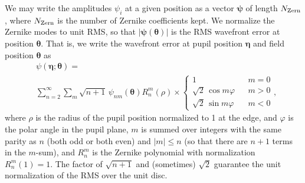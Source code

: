 \documentclass[usenatbib]{mnras}
\begin{document}
We may write the amplitudes $\psi_i$ at a given position as a vector
${\boldsymbol\psi}$ of length $N_{\rm Zern}$, where $N_{\rm Zern}$ is
the number of Zernike coefficients kept. We normalize the Zernike
modes to unit RMS, so that $|{\boldsymbol\psi}({\boldsymbol\theta})|$
is the RMS wavefront error at position ${\boldsymbol\theta}$. That is,
we write the wavefront error at pupil position ${\boldsymbol\eta}$ and
field position ${\boldsymbol\theta}$ as
\begin{align}
&\psi({\boldsymbol\eta};{\boldsymbol\theta}) = \nonumber\\
&\sum_{n=2}^\infty
\sum_{m} \sqrt{n+1}\,\psi_{nm}({\boldsymbol\theta}) R_n^m(\rho)
\times\left\{\begin{array}{ccc} 1 & & m=0 \\ \sqrt2\,\cos m\varphi & &
m>0 \\ \sqrt2\,\sin m\varphi & & m<0 \end{array} \right.,
\end{align}
where $\rho$ is the radius of the pupil position normalized to 1 at
the edge, and $\varphi$ is the polar angle in the pupil plane, $m$ is
summed over integers with the same parity as $n$ (both odd or both
even) and $|m|\le n$ (so that there are $n+1$ terms in the $m$-sum),
and $R_n^m$ is the Zernike polynomial with normalization
$R_n^m(1)=1$. The factor of $\sqrt{n+1}$ and (sometimes) $\sqrt2$
guarantee the unit normalization of the RMS over the unit disc.
\end{document}
